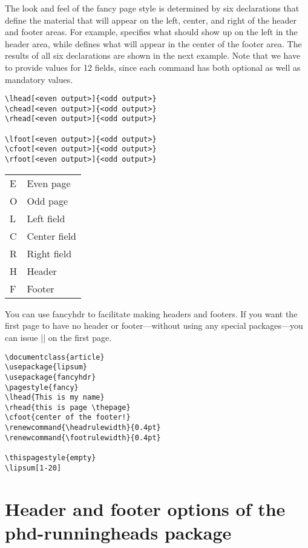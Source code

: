 The look and feel of the fancy page style is determined by six declarations that define the material that will appear on the left, center, and right of the header
and footer areas. For example,  specifies what should show up on the left
in the header area, while  defines what will appear in the center of the
footer area. The results of all six declarations are shown in the next example. Note that we have to provide values for 12 fields, since each command has both optional as well as mandatory values.

\begin{verbatim}
\lhead[<even output>]{<odd output>}
\chead[<even output>]{<odd output>}
\rhead[<even output>]{<odd output>}

\lfoot[<even output>]{<odd output>}
\cfoot[<even output>]{<odd output>}
\rfoot[<even output>]{<odd output>}
\end{verbatim}

\begin{tabular}{ll}
E  &Even page\\
O &Odd page\\
L  &Left field\\
C &Center field\\
R &Right field\\
H &Header\\
F  &Footer\\
\end{tabular}

You can use fancyhdr to facilitate making headers and footers. If you want the first page to have no header or footer---without using any special packages---you can issue |\thispagestyle{empty}| on the first page.


\begin{verbatim}
\documentclass{article}
\usepackage{lipsum}
\usepackage{fancyhdr}
\pagestyle{fancy}
\lhead{This is my name}
\rhead{this is page \thepage}
\cfoot{center of the footer!}
\renewcommand{\headrulewidth}{0.4pt}
\renewcommand{\footrulewidth}{0.4pt}

\thispagestyle{empty}
\lipsum[1-20]

\end{verbatim}

\section{Header and footer options of the phd-runningheads package}

